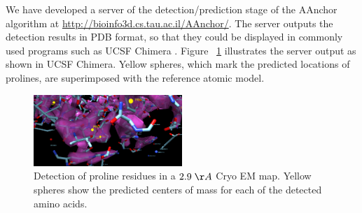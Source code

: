 We have developed a server of the detection/prediction stage of the  AAnchor algorithm at \url{http://bioinfo3d.cs.tau.ac.il/AAnchor/}.
The server outputs the detection results in PDB format, so that they could be displayed in commonly used programs such as UCSF Chimera \cite{Pettersen2004UCSFAnalysis}.
Figure ~\ref{f:t2} illustrates the server output as shown in UCSF Chimera.
Yellow spheres, which mark the predicted locations of prolines, are superimposed with 
the reference atomic model. 
\begin{figure}
  \caption{Detection of proline residues in a $ 2.9 \; \AA$ Cryo EM map. Yellow spheres show the predicted centers of mass for each of the detected amino acids. } \label{f:t2}
  \centering
    \includegraphics[width=0.5\textwidth]{pics/t2.png}
\end{figure}
